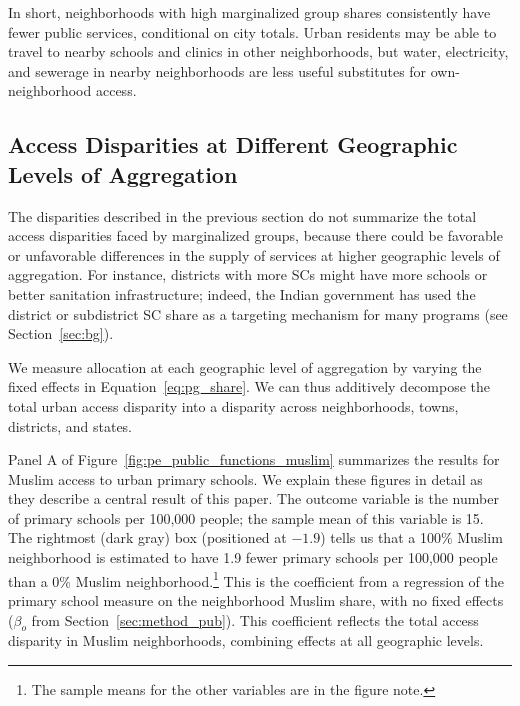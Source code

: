 \documentclass[12pt]{article}
\begin{document}
In short, neighborhoods with high marginalized group shares consistently have fewer public services, conditional on city totals. Urban residents may be able to travel to nearby schools and clinics in other neighborhoods, but water, electricity, and sewerage in nearby neighborhoods are less useful substitutes for own-neighborhood access.

\subsection{Access Disparities at Different Geographic Levels of Aggregation}
\label{sec:res_aggs}

The disparities described in the previous section do not summarize the total access disparities faced by marginalized groups, because there could be favorable or unfavorable differences in the supply of services at higher geographic levels of aggregation. For instance, districts with more SCs might have more schools or better sanitation infrastructure; indeed, the Indian government has used the district or subdistrict SC share as a targeting mechanism for many programs (see Section~\ref{sec:bg}).

We measure allocation at each geographic level of aggregation by varying the fixed effects in Equation~\ref{eq:pg_share}. We can thus additively decompose the total urban access disparity into a disparity across neighborhoods, towns, districts, and states.

Panel A of Figure~\ref{fig:pe_public_functions_muslim} summarizes the results for Muslim access to urban primary schools. We explain these figures in detail as they describe a central result of this paper. The outcome variable is the number of primary schools per 100,000 people; the sample mean of this variable is 15. The rightmost (dark gray) box (positioned at $-1.9$) tells us that a 100\% Muslim neighborhood is estimated to have 1.9 fewer primary schools per 100,000 people than a 0\% Muslim neighborhood.\footnote{The sample means for the other variables are in the figure note.} This is the coefficient from a regression of the primary school measure on the neighborhood Muslim share, with no fixed effects ($\beta_o$ from Section~\ref{sec:method_pub}). This coefficient reflects the total access disparity in Muslim neighborhoods, combining effects at all geographic levels.
\end{document}
